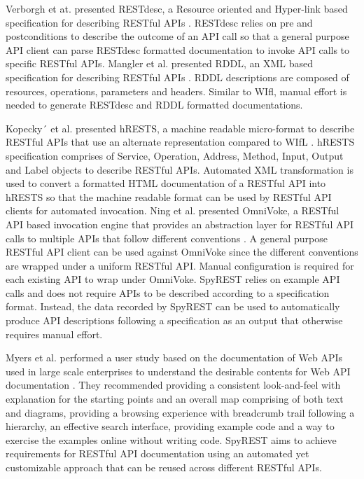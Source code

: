 \documentclass[conference]{IEEEtran}
\begin{document}
Verborgh et at. presented RESTdesc, a Resource oriented and Hyper-link based specification for describing RESTful APIs \cite{Verborgh_functional}. RESTdesc relies on pre and postconditions to describe the outcome of an API call so that a general purpose API client can parse RESTdesc formatted documentation to invoke API calls to specific RESTful APIs. Mangler et al. presented RDDL, an XML based specification for describing RESTful APIs \cite{Mangler_rddl}. RDDL descriptions are composed of resources, operations, parameters and headers. Similar to WIfl, manual effort is needed to generate RESTdesc and RDDL formatted documentations.

Kopecky´ et al. presented hRESTS, a machine readable micro-format to describe RESTful APIs that use an alternate representation compared to WIfL \cite{Kopecky_hrests}. hRESTS specification comprises of Service, Operation, Address, Method, Input, Output and Label objects to describe RESTful APIs. Automated XML transformation is used to convert a formatted HTML documentation of a RESTful API into hRESTS so that the machine readable format can be used by RESTful API clients for automated invocation. Ning et al. presented OmniVoke, a RESTful API based invocation engine that provides an abstraction layer for RESTful API calls to multiple APIs that follow different conventions \cite{Ning_omnivoke}. A general purpose RESTful API client can be used against OmniVoke since the different conventions are wrapped under a uniform RESTful API. Manual configuration is required for each existing API to wrap under OmniVoke. SpyREST relies on example API calls and does not require APIs to be described according to a specification format. Instead, the data recorded by SpyREST can be used to automatically produce API descriptions following a specification as an output that otherwise requires manual effort.

Myers et al. performed a user study based on the documentation of Web APIs used in large scale enterprises to understand the desirable contents for Web API documentation \cite{Myers_study}. They recommended providing a consistent look-and-feel with explanation for the starting points and an overall map comprising of both text and diagrams, providing a browsing experience with breadcrumb trail following a hierarchy, an effective search interface, providing example code and a way to exercise the examples online without writing code. SpyREST aims to achieve requirements for RESTful API documentation using an automated yet customizable approach that can be reused across different RESTful APIs.
\end{document}
